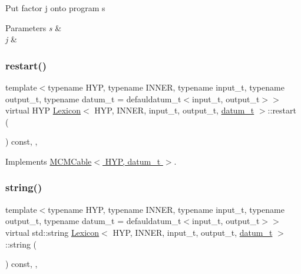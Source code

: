 Put factor j onto program s 
\begin{DoxyParams}{Parameters}
{\em s} & \\
\hline
{\em j} & \\
\hline
\end{DoxyParams}
\mbox{\label{class_lexicon_ac8577ba9b4554ebf1852020c617bd7df}} 
\subsubsection{\texorpdfstring{restart()}{restart()}}
{\footnotesize\ttfamily template$<$typename H\+YP, typename I\+N\+N\+ER, typename input\+\_\+t, typename output\+\_\+t, typename datum\+\_\+t = defauldatum\+\_\+t$<$input\+\_\+t, output\+\_\+t$>$$>$ \\
virtual H\+YP \hyperlink{class_lexicon}{Lexicon}$<$ H\+YP, I\+N\+N\+ER, input\+\_\+t, output\+\_\+t, \hyperlink{class_bayesable_a9f1a6c0cd7855550fa10b1a8f13a5867}{datum\+\_\+t} $>$\+::restart (\begin{DoxyParamCaption}{ }\end{DoxyParamCaption}) const\hspace{0.3cm}{\ttfamily [inline]}, {\ttfamily [override]}, {\ttfamily [virtual]}}



Implements \hyperlink{class_m_c_m_cable_a220d6c4ca73e20441c14fa5bd3e090d3}{M\+C\+M\+Cable$<$ H\+Y\+P, datum\+\_\+t $>$}.

\mbox{\label{class_lexicon_a5c584d2885a21542082332a26eb0961b}} 
\subsubsection{\texorpdfstring{string()}{string()}}
{\footnotesize\ttfamily template$<$typename H\+YP, typename I\+N\+N\+ER, typename input\+\_\+t, typename output\+\_\+t, typename datum\+\_\+t = defauldatum\+\_\+t$<$input\+\_\+t, output\+\_\+t$>$$>$ \\
virtual std\+::string \hyperlink{class_lexicon}{Lexicon}$<$ H\+YP, I\+N\+N\+ER, input\+\_\+t, output\+\_\+t, \hyperlink{class_bayesable_a9f1a6c0cd7855550fa10b1a8f13a5867}{datum\+\_\+t} $>$\+::string (\begin{DoxyParamCaption}{ }\end{DoxyParamCaption}) const\hspace{0.3cm}{\ttfamily [inline]}, {\ttfamily [override]}, {\ttfamily [virtual]}}

